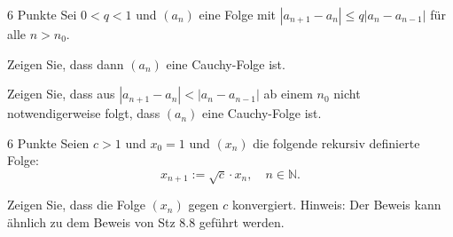 \documentclass{problemset}
\begin{document}
\begin{problem}{6 Punkte}
Sei $0 < q < 1$ und $(a_n)$ eine Folge mit $|a_{n+1} - a_n| \leq q |a_n - a_{n-1}|$ für alle $n > n_0$.

\item Zeigen Sie, dass dann $(a_n)$ eine Cauchy-Folge ist.

\item Zeigen Sie, dass aus $|a_{n+1} - a_n| < |a_n - a_{n-1}|$ ab einem $n_0$ nicht notwendigerweise folgt, dass $(a_n)$ eine Cauchy-Folge ist.
\end{problem}

\begin{problem}{6 Punkte}
Seien $c > 1$ und $x_0 = 1$ und $(x_n)$ die folgende rekursiv definierte Folge:
\[
	x_{n+1} := \sqrt{c} \cdot x_n, \quad n \in \mathbb{N}.
\]

Zeigen Sie, dass die Folge $(x_n)$ gegen $c$ konvergiert. Hinweis: Der Beweis kann ähnlich zu dem Beweis von Stz 8.8 geführt werden.
\end{problem}
\end{document}
